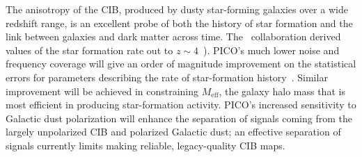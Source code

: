 \documentclass[PICOReport.tex]{subfiles}
\begin{document}
The anisotropy of the \ac{CIB}, produced by dusty star-forming galaxies over a wide redshift range, is an excellent probe of both the history of star formation and the link between galaxies and dark matter across time. The \planck\ collaboration derived values of the star formation rate out to $z\sim4$~\cite{2014A&A...571A..30P,2014A&A...571A..18P,madau2014}).
PICO's much lower noise and frequency coverage will give an order of magnitude improvement on the statistical errors for
parameters describing the rate of star-formation history~\cite{Wu:2016hej}. 
Similar improvement will be achieved in constraining $M_{\mathrm{eff}}$, the galaxy halo mass that is most efficient in producing star-formation activity. PICO's increased sensitivity to Galactic dust polarization will enhance the separation of signals coming from 
the largely unpolarized \ac{CIB} and polarized Galactic dust; an effective separation of signals currently limits making reliable, legacy-quality \ac{CIB} maps.


\end{document}

